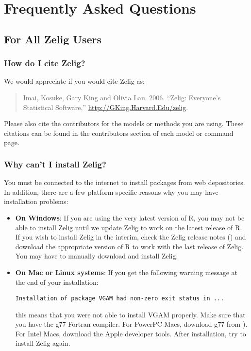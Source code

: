 \chapter{Frequently Asked Questions}

\section{For All Zelig Users}

\subsection*{How do I cite Zelig?}
We would appreciate if you would cite Zelig as:  
\begin{verse}
  Imai, Kosuke, Gary King and Olivia Lau.  2006.  ``Zelig:
  Everyone's Statistical Software,''   \url{http://GKing.Harvard.Edu/zelig}.
\end{verse}
Please also cite the contributors for the models or methods you are
using.  These citations can be found in the contributors section of
each model or command page.

\subsection*{Why can't I install Zelig?}

You must be connected to the internet to install packages from web
depositories.  In addition, there are a few platform-specific reasons
why you may have installation problems:

\begin{itemize}
\item \textbf{On Windows}: If you are using the very latest version of
  R, you may not be able to install Zelig until we update Zelig to
  work on the latest release of R. If you wish to install Zelig in the
  interim, check the Zelig release notes () and
  download the appropriate version of R to work with the last release
  of Zelig.  You may have to manually download and install Zelig.  

\item \textbf{On Mac or Linux systems}:  If you get the following
  warning message at the end of your installation:  
\begin{verbatim}
Installation of package VGAM had non-zero exit status in ...
\end{verbatim}
this means that you were not able to install VGAM properly.  Make sure
that you have the g77 Fortran compiler.  For PowerPC Macs, download
g77 from
). For
Intel Macs, download the
 Apple developer
tools.  After installation, try to install Zelig again.  
\end{itemize}

